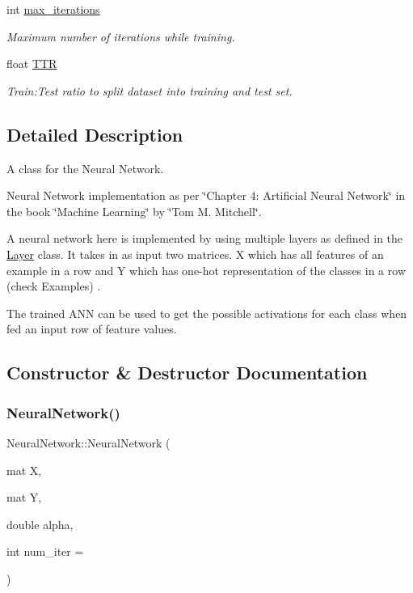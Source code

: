 \begin{DoxyCompactItemize}
\mbox{\label{classNeuralNetwork_af7bf7934f5e401b8d3003ea0fad86aa8}} 
int \hyperlink{classNeuralNetwork_af7bf7934f5e401b8d3003ea0fad86aa8}{max\+\_\+iterations}
\begin{DoxyCompactList}\small\item\em Maximum number of iterations while training. \end{DoxyCompactList}\item 
\mbox{\label{classNeuralNetwork_a684adf6f34b5847e8226edd419132dd4}} 
float \hyperlink{classNeuralNetwork_a684adf6f34b5847e8226edd419132dd4}{T\+TR}
\begin{DoxyCompactList}\small\item\em Train\+:Test ratio to split dataset into training and test set. \end{DoxyCompactList}\end{DoxyCompactItemize}


\subsection{Detailed Description}
A class for the Neural Network. 

Neural Network implementation as per \char`\"{}\+Chapter 4\+: Artificial Neural Network\char`\"{} in the book \char`\"{}\+Machine Learning\char`\"{} by \char`\"{}\+Tom M. Mitchell\char`\"{}.

A neural network here is implemented by using multiple layers as defined in the \hyperlink{classLayer}{Layer} class. It takes in as input two matrices. X which has all features of an example in a row and Y which has one-\/hot representation of the classes in a row (check Examples) .

The trained A\+NN can be used to get the possible activations for each class when fed an input row of feature values. 

\subsection{Constructor \& Destructor Documentation}
\mbox{\label{classNeuralNetwork_a2e6c1d53b25f32ab7b86f5724fda034e}} 
\subsubsection{\texorpdfstring{Neural\+Network()}{NeuralNetwork()}}
{\footnotesize\ttfamily Neural\+Network\+::\+Neural\+Network (\begin{DoxyParamCaption}\item[{mat}]{X,  }\item[{mat}]{Y,  }\item[{double}]{alpha,  }\item[{int}]{num\+\_\+iter = {} }\end{DoxyParamCaption})}



